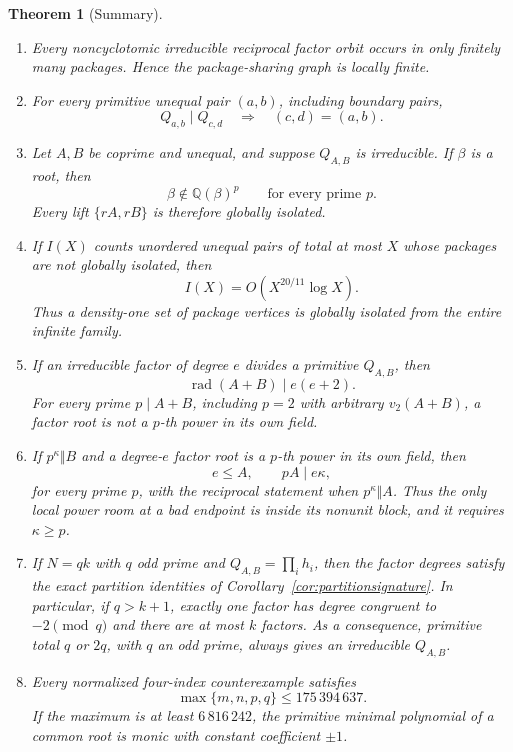\documentclass[11pt]{article}
\newtheorem{theorem}{Theorem}[section]
\theoremstyle{definition}
\newcommand{\Q}{\mathbb Q}
\begin{document}
\begin{theorem}[Summary]\label{thm:summary}
\leavevmode
\begin{enumerate}[label=(\roman*)]
\item Every noncyclotomic irreducible reciprocal factor orbit occurs in only
finitely many packages.  Hence the package-sharing graph is locally finite.

\item For every primitive unequal pair \((a,b)\), including boundary pairs,
\[
 Q_{a,b}\mid Q_{c,d}\quad\Longrightarrow\quad(c,d)=(a,b).
\]

\item Let \(A,B\) be coprime and unequal, and suppose \(Q_{A,B}\) is
irreducible.  If \(\beta\) is a root, then
\[
 \beta\notin\Q(\beta)^p
 \qquad\text{for every prime }p.
\]
Every lift \(\{rA,rB\}\) is therefore globally isolated.

\item If \(I(X)\) counts unordered unequal pairs of total at most \(X\)
whose packages are not globally isolated, then
\[
 I(X)=O\!\left(X^{20/11}\log X\right).
\]
Thus a density-one set of package vertices is globally isolated from the
entire infinite family.

\item If an irreducible factor of degree \(e\) divides a primitive
\(Q_{A,B}\), then
\[
 \operatorname{rad}(A+B)\mid e(e+2).
\]
For every prime \(p\mid A+B\), including \(p=2\) with arbitrary
\(v_2(A+B)\), a factor root is not a \(p\)-th power in its own field.

\item If \(p^\kappa\Vert B\) and a degree-\(e\) factor root is a
\(p\)-th power in its own field, then
\[
 e\leq A,\qquad pA\mid e\kappa,
\]
for every prime \(p\), with the reciprocal statement when
\(p^\kappa\Vert A\).  Thus the only local power room at a bad endpoint is
inside its nonunit block, and it requires \(\kappa\geq p\).

\item If \(N=qk\) with \(q\) odd prime and
\(Q_{A,B}=\prod_i h_i\), then the factor degrees satisfy the exact
partition identities of Corollary~\ref{cor:partitionsignature}.  In
particular, if \(q>k+1\), exactly one factor has degree congruent to
\(-2\pmod q\) and there are at most \(k\) factors.  As a consequence,
primitive total \(q\) or \(2q\), with \(q\) an odd prime, always gives
an irreducible \(Q_{A,B}\).

\item Every normalized four-index counterexample satisfies
\[
 \max\{m,n,p,q\}\leq175\,394\,637.
\]
If the maximum is at least \(6\,816\,242\), the primitive minimal polynomial
of a common root is monic with constant coefficient \(\pm1\).


\end{enumerate}
\end{theorem}
\end{document}
